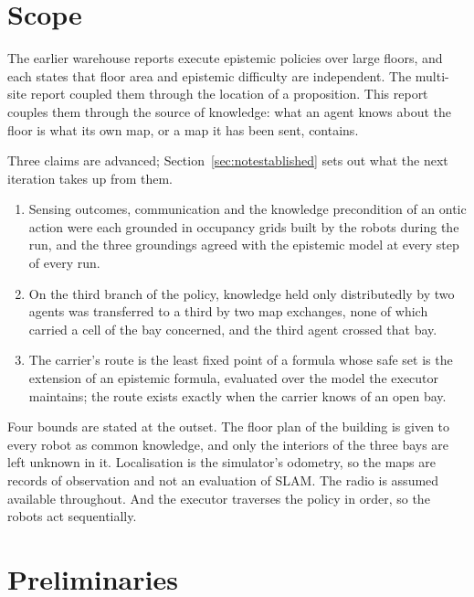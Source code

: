\documentclass[11pt,a4paper]{article}
\theoremstyle{definition}
\begin{document}
\tableofcontents
\newpage

\section{Scope}
\label{sec:scope}

The earlier warehouse reports execute epistemic policies over large floors, and
each states that floor area and epistemic difficulty are independent. The
multi-site report coupled them through the location of a proposition. This
report couples them through the source of knowledge: what an agent knows about
the floor is what its own map, or a map it has been sent, contains.

Three claims are advanced; Section~\ref{sec:notestablished} sets out what
the next iteration takes up from them.

\begin{enumerate}[leftmargin=1.4em, itemsep=2pt]
  \item Sensing outcomes, communication and the knowledge precondition of an
        ontic action were each grounded in occupancy grids built by the robots
        during the run, and the three groundings agreed with the epistemic model
        at every step of every run.
  \item On the third branch of the policy, knowledge held only distributedly
        by two agents was transferred to a third by two map exchanges, none of
        which carried a cell of the bay concerned, and the third agent crossed
        that bay.
  \item The carrier's route is the least fixed point of a formula whose safe
        set is the extension of an epistemic formula, evaluated over the model
        the executor maintains; the route exists exactly when the carrier knows
        of an open bay.
\end{enumerate}

Four bounds are stated at the outset. The floor plan of the building is given
to every robot as common knowledge, and only the interiors of the three bays
are left unknown in it. Localisation is the simulator's odometry, so the maps
are records of observation and not an evaluation of SLAM. The radio is assumed
available throughout. And the executor traverses the policy in order, so the
robots act sequentially.

\section{Preliminaries}
\label{sec:prelim}
\end{document}
